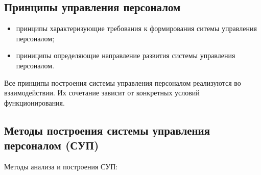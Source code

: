 \documentclass[a4paper,12pt,oneside,final]{extarticle}
\numberwithin{equation}{section}
\begin{document}
\subsection{Принципы управления персоналом}
\begin{itemize}
	\item принципы характеризующие требования к формирования ситемы управления персоналом;
	\item приниципы определяющие направление развития системы управления персоналом.
\end{itemize}
Все принципы построения системы управления персоналом реализуются во взаимодействии. Их сочетание зависит от конкретных условий функционирования.

\subsection{Методы построения системы управления персоналом (СУП)}
Методы анализа и построения СУП: 
\end{document}
